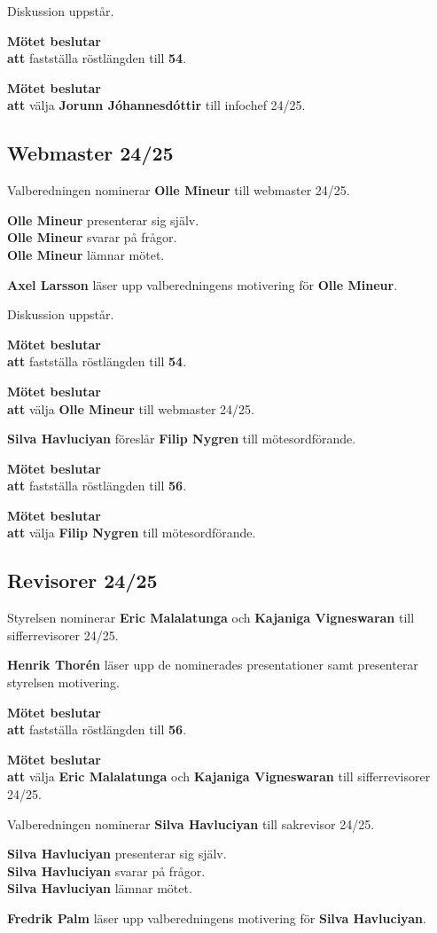 \documentclass{datateknologsektionen-document}
\newcommand{\ind}{\hspace*{2em}}
\newcommand{\motetbeslutar}{\textbf{Mötet beslutar}}
\newcommand{\att}{\\\ind\textbf{att}}
\newcommand{\rostlangd}[1]{\motetbeslutar\att{} fastställa röstlängden till \textbf{#1}.}
\begin{document}
Diskussion uppstår.

\rostlangd{54}

\motetbeslutar\att{} välja \textbf{Jorunn Jóhannesdóttir} till infochef 24/25.

\subsection{Webmaster 24/25}

Valberedningen nominerar \textbf{Olle Mineur} till webmaster 24/25.

\textbf{Olle Mineur} presenterar sig själv.\\
\textbf{Olle Mineur} svarar på frågor.\\
\textbf{Olle Mineur} lämnar mötet.

\textbf{Axel Larsson} läser upp valberedningens motivering för \textbf{Olle Mineur}.

Diskussion uppstår.

\rostlangd{54}

\motetbeslutar\att{} välja \textbf{Olle Mineur} till webmaster 24/25.

\textbf{Silva Havluciyan} föreslår \textbf{Filip Nygren} till mötesordförande.

\rostlangd{56}

\motetbeslutar\att{} välja \textbf{Filip Nygren} till mötesordförande.

\subsection{Revisorer 24/25}

Styrelsen nominerar \textbf{Eric Malalatunga} och \textbf{Kajaniga Vigneswaran} till sifferrevisorer 24/25.

\textbf{Henrik Thorén} läser upp de nominerades presentationer samt presenterar styrelsen motivering.

\rostlangd{56}

\motetbeslutar\att{} välja \textbf{Eric Malalatunga} och \textbf{Kajaniga Vigneswaran} till sifferrevisorer 24/25.

Valberedningen nominerar \textbf{Silva Havluciyan} till sakrevisor 24/25.

\textbf{Silva Havluciyan} presenterar sig själv.\\
\textbf{Silva Havluciyan} svarar på frågor.\\
\textbf{Silva Havluciyan} lämnar mötet.

\textbf{Fredrik Palm} läser upp valberedningens motivering för \textbf{Silva Havluciyan}.
\end{document}
